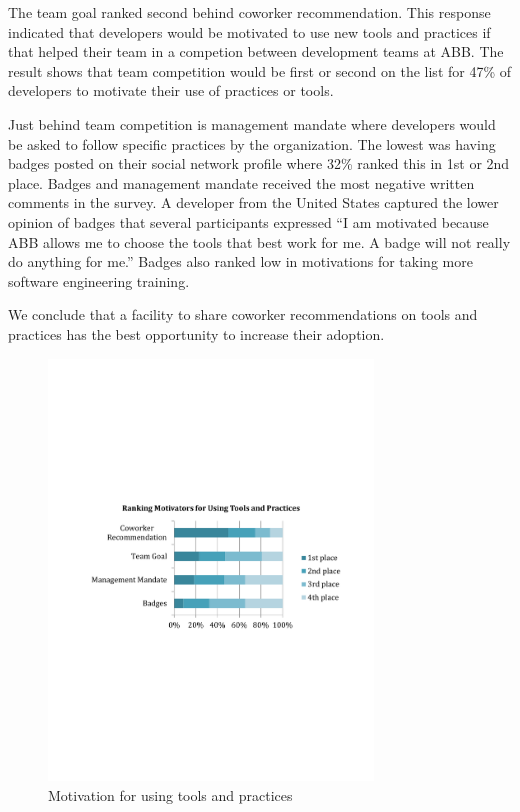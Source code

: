 \documentclass{sig-alternate}
\begin{document}
The team goal ranked second behind coworker recommendation.  This response indicated that developers would be motivated to use new tools and practices if that helped their team in a competion between development teams at ABB.  The result shows that team competition would be first or second on the list for  47\% of developers to motivate their use of practices or tools.  

Just behind team competition is management mandate where developers would be asked to follow specific practices by the organization.  The lowest was having badges posted on their social network profile where 32\% ranked this in 1st or 2nd place.   Badges and management mandate received the most negative written comments in the survey.  A developer from the United States captured the lower opinion of badges that several participants expressed ``I am motivated because ABB allows me to choose the tools that best work for me. A badge will not really do anything for me.''  Badges also ranked low in motivations for taking more software engineering training.  

We conclude that a facility to share coworker recommendations on tools and practices has the best opportunity to increase their adoption.  
 
\begin{figure}
	\includegraphics[width=3.4in]{ToolAndPracticeMotivators.pdf}
	\caption{Motivation for using tools and practices}
	\label{fig:toolandpracticemotivators}
\end{figure}
\end{document}
